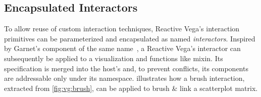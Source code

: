 \subsection{Encapsulated Interactors}

To allow reuse of custom interaction techniques, Reactive Vega's interaction
primitives can be parameterized and encapsulated as named \emph{interactors}.
Inspired by Garnet's component of the same name~\cite{myers:garnet}, a Reactive
Vega's interactor can subsequently be applied to a visualization and functions
like mixin. Its specification is merged into the host's and, to prevent
conflicts, its components are addressable only under its namespace.
 illustrates how a brush interaction, extracted
from \cref{fig:vg:brush}, can be applied to brush \& link a scatterplot matrix.